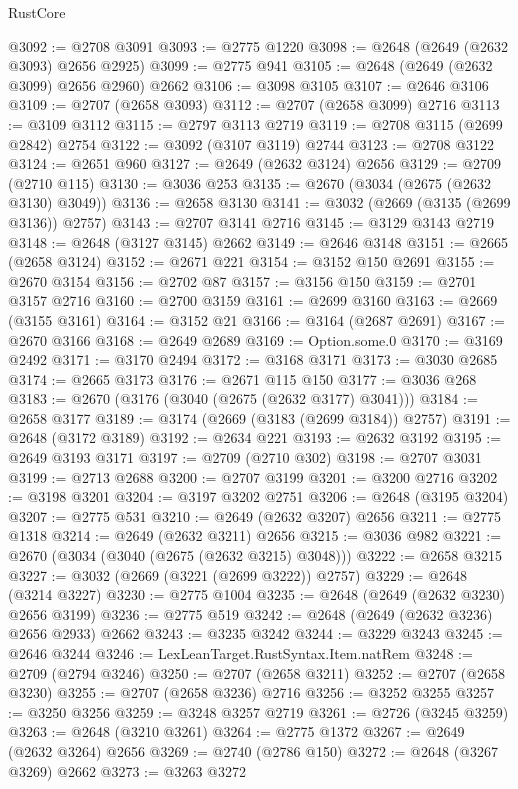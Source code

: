 \begin{lexlean}{RustCore}
\begin{coremodule}
@3092 := @2708 @3091
@3093 := @2775 @1220
@3098 := @2648 (@2649 (@2632 @3093) @2656 @2925)
@3099 := @2775 @941
@3105 := @2648 (@2649 (@2632 @3099) @2656 @2960) @2662
@3106 := @3098 @3105
@3107 := @2646 @3106
@3109 := @2707 (@2658 @3093)
@3112 := @2707 (@2658 @3099) @2716
@3113 := @3109 @3112
@3115 := @2797 @3113 @2719
@3119 := @2708 @3115 (@2699 @2842) @2754
@3122 := @3092 (@3107 @3119) @2744
@3123 := @2708 @3122
@3124 := @2651 @960
@3127 := @2649 (@2632 @3124) @2656
@3129 := @2709 (@2710 @115)
@3130 := @3036 @253
@3135 := @2670 (@3034 (@2675 (@2632 @3130) @3049))
@3136 := @2658 @3130
@3141 := @3032 (@2669 (@3135 (@2699 @3136)) @2757)
@3143 := @2707 @3141 @2716
@3145 := @3129 @3143 @2719
@3148 := @2648 (@3127 @3145) @2662
@3149 := @2646 @3148
@3151 := @2665 (@2658 @3124)
@3152 := @2671 @221
@3154 := @3152 @150 @2691
@3155 := @2670 @3154
@3156 := @2702 @87
@3157 := @3156 @150
@3159 := @2701 @3157 @2716
@3160 := @2700 @3159
@3161 := @2699 @3160
@3163 := @2669 (@3155 @3161)
@3164 := @3152 @21
@3166 := @3164 (@2687 @2691)
@3167 := @2670 @3166
@3168 := @2649 @2689
@3169 := Option.some.{0}
@3170 := @3169 @2492
@3171 := @3170 @2494
@3172 := @3168 @3171
@3173 := @3030 @2685
@3174 := @2665 @3173
@3176 := @2671 @115 @150
@3177 := @3036 @268
@3183 := @2670 (@3176 (@3040 (@2675 (@2632 @3177) @3041)))
@3184 := @2658 @3177
@3189 := @3174 (@2669 (@3183 (@2699 @3184)) @2757)
@3191 := @2648 (@3172 @3189)
@3192 := @2634 @221
@3193 := @2632 @3192
@3195 := @2649 @3193 @3171
@3197 := @2709 (@2710 @302)
@3198 := @2707 @3031
@3199 := @2713 @2688
@3200 := @2707 @3199
@3201 := @3200 @2716
@3202 := @3198 @3201
@3204 := @3197 @3202 @2751
@3206 := @2648 (@3195 @3204)
@3207 := @2775 @531
@3210 := @2649 (@2632 @3207) @2656
@3211 := @2775 @1318
@3214 := @2649 (@2632 @3211) @2656
@3215 := @3036 @982
@3221 := @2670 (@3034 (@3040 (@2675 (@2632 @3215) @3048)))
@3222 := @2658 @3215
@3227 := @3032 (@2669 (@3221 (@2699 @3222)) @2757)
@3229 := @2648 (@3214 @3227)
@3230 := @2775 @1004
@3235 := @2648 (@2649 (@2632 @3230) @2656 @3199)
@3236 := @2775 @519
@3242 := @2648 (@2649 (@2632 @3236) @2656 @2933) @2662
@3243 := @3235 @3242
@3244 := @3229 @3243
@3245 := @2646 @3244
@3246 := LexLeanTarget.RustSyntax.Item.natRem
@3248 := @2709 (@2794 @3246)
@3250 := @2707 (@2658 @3211)
@3252 := @2707 (@2658 @3230)
@3255 := @2707 (@2658 @3236) @2716
@3256 := @3252 @3255
@3257 := @3250 @3256
@3259 := @3248 @3257 @2719
@3261 := @2726 (@3245 @3259)
@3263 := @2648 (@3210 @3261)
@3264 := @2775 @1372
@3267 := @2649 (@2632 @3264) @2656
@3269 := @2740 (@2786 @150)
@3272 := @2648 (@3267 @3269) @2662
@3273 := @3263 @3272

\end{coremodule}
\end{lexlean}

